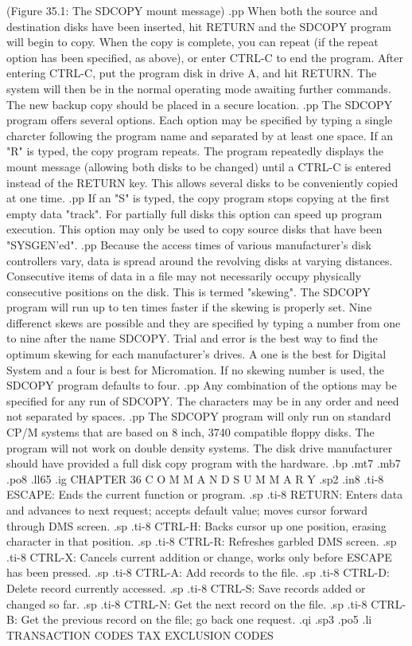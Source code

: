 	 (Figure 35.1: The SDCOPY mount message)
.pp
When both the source and destination disks have been inserted, hit RETURN
and the SDCOPY program will begin to copy.  When the copy is complete,
you can repeat (if the repeat option has been specified, as above), or
enter CTRL-C to end the program.  After entering CTRL-C, put
the program disk in drive A, and hit RETURN. The system will then be in the
normal operating mode awaiting further commands.  The new backup
copy should be placed in a secure location.
.pp
The SDCOPY program offers several options.  Each option may be specified
by typing a single charcter following the program name and separated by
at least one space.  If an "R" is typed, the copy program repeats.  The
program repeatedly displays the mount message (allowing both disks
to be changed) until a CTRL-C is entered instead of the RETURN key.  This
allows several disks to be conveniently copied at one time.
.pp
If an "S" is typed, the copy program stops copying at the first
empty data "track".  For partially full disks this option can
speed up program execution.  This option may only be used to copy source
disks that have been "SYSGEN'ed".
.pp
Because the access times of various manufacturer's disk controllers vary,
data is spread around the revolving disks at varying distances.  Consecutive
items of data in a file may not necessarily occupy physically consecutive
positions on the disk.	This is termed "skewing".  The SDCOPY program
will run up to ten times faster if the skewing is properly set.  Nine
differenct skews are possible and they are specified by typing a number
from one to nine after the name SDCOPY.  Trial and error is the best
way to find the optimum skewing for each manufacturer's drives.  A
one is the best for Digital System and a four is best for Micromation.
If no skewing number is used, the SDCOPY program defaults to four.
.pp
Any combination of the options may be specified for any run of
SDCOPY.  The characters may be in any order and need not separated by
spaces.
.pp
The SDCOPY program will only run on standard CP/M systems that are based
on 8 inch, 3740 compatible floppy disks.  The program will not work
on double density systems.  The disk drive manufacturer should have
provided a full disk copy program with the hardware.
.bp
.mt7
.mb7
.po8
.ll65
.ig
CHAPTER 36
C O M M A N D	 S U M M A R Y
.sp2
.in8
.ti-8
ESCAPE: Ends the current function or program.
.sp
.ti-8
RETURN: Enters data and advances to next request; accepts default value;
moves cursor forward through DMS screen.
.sp
.ti-8
CTRL-H: Backs cursor up one position, erasing character in that position.
.sp
.ti-8
CTRL-R: Refreshes garbled DMS screen.
.sp
.ti-8
CTRL-X: Cancels current addition or change, works only before ESCAPE has
been pressed.
.sp
.ti-8
CTRL-A: Add records to the file.
.sp
.ti-8
CTRL-D: Delete record currently accessed.
.sp
.ti-8
CTRL-S: Save records added or changed so far.
.sp
.ti-8
CTRL-N: Get the next record on the file.
.sp
.ti-8
CTRL-B: Get the previous record on the file; go back one request.
.qi
.sp3
.po5
.li
	  TRANSACTION CODES			 TAX EXCLUSION CODES

